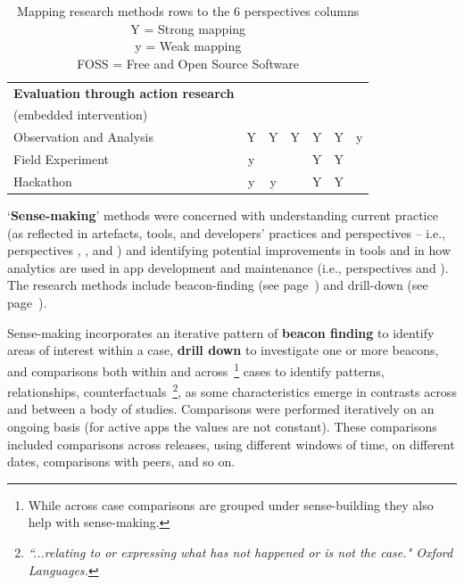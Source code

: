 \begin{table}
\begin{tabular}{l|ccc|ccc}
        \hline
        \textbf{Evaluation through action research} & & & & & & \\
        (embedded intervention)  & & & & & &  \\
        Observation and Analysis &Y &Y &Y &Y &Y &y \\
        Field Experiment         &y &  &  &Y &Y &  \\
        Hackathon                &y &y &  &Y &Y &  \\
        
        \bottomrule
    \end{tabular}
    \caption[Mapping research methods rows to the 6 perspectives columns]{Mapping research methods rows to the 6 perspectives columns \\ Y = Strong mapping \\ y = Weak mapping \\FOSS = Free and Open Source Software}
    \label{tab:mapping-analysis-to-six-perspectives}
\end{table}

`\textbf{Sense-making}' methods were concerned with understanding current practice (as reflected in artefacts, tools, and developers' practices and perspectives -- i.e., perspectives \uartefacts, \utools, and \uuse) and identifying potential improvements in tools and in how analytics are used in app development and maintenance (i.e., perspectives \itools and \iartefacts). The research methods include beacon-finding (see page~\pageref{section-beacon-finding-method}) and drill-down (see page~\pageref{drill-down-research-method}).

Sense-making incorporates an iterative pattern of \textbf{beacon finding} to identify areas of interest within a case, \textbf{drill down} to investigate one or more beacons, and comparisons both within and across~\footnote{While across case comparisons are grouped under sense-building they also help with sense-making.} cases to identify patterns, relationships, counterfactuals~\footnote{\emph{``...relating to or expressing what has not happened or is not the case." Oxford Languages.}}, as some characteristics emerge in contrasts across and between a body of studies. 
%
Comparisons were performed iteratively on an ongoing basis (for active apps the values are not constant). These comparisons included comparisons across releases, using different windows of time, on different dates, comparisons with peers, and so on.


